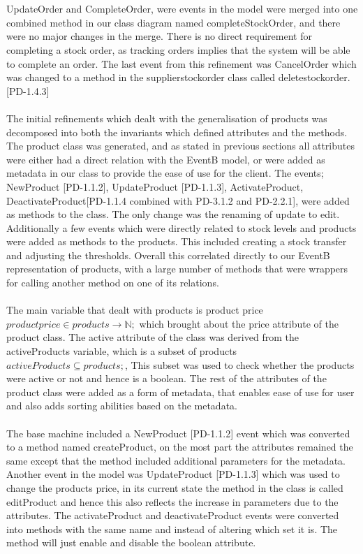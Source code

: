 \documentclass[a4paper]{article}
\begin{document}
\\\\
UpdateOrder and CompleteOrder, were events in the model were merged into one combined method in our class diagram named completeStockOrder, and there were no major changes in the merge. There is no direct requirement for completing a stock order, as tracking orders implies that the system will be able to complete an order. The last event from this refinement was CancelOrder which was changed to a method in the supplierstockorder class called deletestockorder. [PD-1.4.3]
\\\\
The initial refinements which dealt with the generalisation of products was decomposed into both the invariants which defined attributes and the methods. The product class was generated, and as stated in previous sections all attributes were either had a direct relation with the EventB model, or were added as metadata in our class to provide the ease of use for the client. The events; NewProduct [PD-1.1.2], UpdateProduct [PD-1.1.3], ActivateProduct, DeactivateProduct[PD-1.1.4 combined with PD-3.1.2 and PD-2.2.1], were added as methods to the class. The only change was the renaming of update to edit. Additionally a few events which were directly related to stock levels and products were added as methods to the products. This included creating a stock transfer and adjusting the thresholds. Overall this correlated directly to our EventB representation of products, with a large number of methods that were wrappers for calling another method on one of its relations.
\\\\
The main variable that dealt with products is product price \(productprice ∈ products → ℕ;\) which brought about the price attribute of the product class. The active attribute of the class was derived from the activeProducts variable, which is a subset of products \(activeProducts ⊆ products;\), This subset was used to check whether the products were active or not and hence is a boolean. The  rest of the attributes of the product class were added as a form of metadata, that enables ease of use for user and also adds sorting abilities based on the metadata.
\\\\
The base machine included a NewProduct [PD-1.1.2] event which was converted to a method named createProduct, on the most part the attributes remained the same except that the method included additional parameters for the metadata. Another event in the model was UpdateProduct  [PD-1.1.3] which was used to change the products price, in its current state the  method in the class is called editProduct and hence this also reflects the increase in parameters due to the attributes. The activateProduct and deactivateProduct events were converted into methods with the same name and instead of altering which set it is. The method will just enable and disable the boolean attribute.
\end{document}
